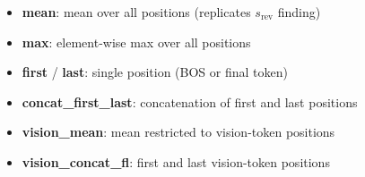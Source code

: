 \documentclass{article}
\theoremstyle{remark}
\begin{document}
\begin{itemize}
    \item \textbf{mean}: mean over all positions (replicates $s_\text{rev}$ finding)
    \item \textbf{max}: element-wise max over all positions
    \item \textbf{first} / \textbf{last}: single position (BOS or final token)
    \item \textbf{concat\_first\_last}: concatenation of first and last positions
    \item \textbf{vision\_mean}: mean restricted to vision-token positions
    \item \textbf{vision\_concat\_fl}: first and last vision-token positions
\end{itemize}

\begin{table}[h]
\centering
\caption{Exploratory probe accuracy (GroupKFold CV, fwd/rev pairs kept together) for forward vs.\ reverse classification from LLM hidden states. Linear reports the best observed $C \in \{0.01, 0.1, 1, 10, 100\}$ on the same CV folds; MLP is a 2-layer network. Chance = 0.500. No nested-CV or held-out selection correction is applied.}
\label{tab:linear_probe}
\end{table}
\end{document}
